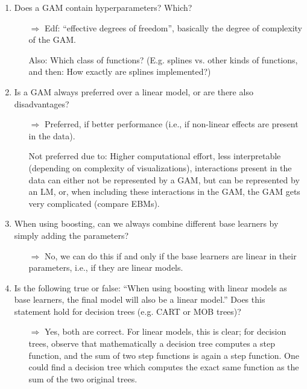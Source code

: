 \begin{enumerate}
    \item Does a GAM contain hyperparameters? Which?
    \begin{itemize}
        \item[$\Rightarrow$]
        Edf: ``effective degrees of freedom'', basically the degree of complexity of the GAM.
        
        Also: Which class of functions? (E.g. splines vs. other kinds of functions, and then: How exactly are splines implemented?)
    \end{itemize}

    \item Is a GAM always preferred over a linear model, or are there also disadvantages?
    \begin{itemize}
        \item[$\Rightarrow$]
        Preferred, if better performance (i.e., if non-linear effects are present in the data).
        
        Not preferred due to: Higher computational effort, less interpretable (depending on complexity of visualizations), interactions present in the data can either not be represented by a GAM, but can be represented by an LM, or, when including these interactions in the GAM, the GAM gets very complicated (compare EBMs).
    \end{itemize}

    \item When using boosting, can we always combine different base learners by simply adding the parameters?
    \begin{itemize}
        \item[$\Rightarrow$] No, we can do this if and only if the base learners are linear in their parameters, i.e., if they are linear models.
    \end{itemize}

    \item Is the following true or false: ``When using boosting with linear models as base learners, the final model will also be a linear model.''
    Does this statement hold for decision trees (e.g. CART or MOB trees)?
    \begin{itemize}
        \item[$\Rightarrow$] Yes, both are correct.
        For linear models, this is clear; for decision trees, observe that mathematically a decision tree computes a step function, and the sum of two step functions is again a step function.
        One could find a decision tree which computes the exact same function as the sum of the two original trees.
    \end{itemize}


\end{enumerate}

